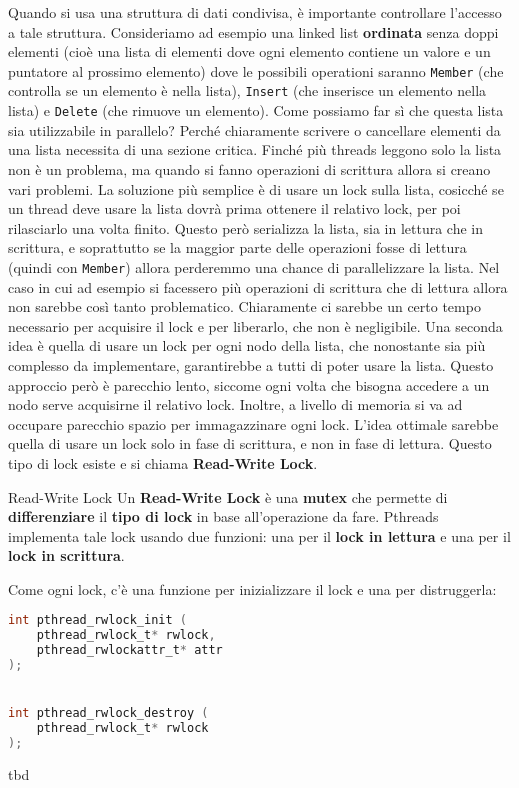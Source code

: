 Quando si usa una struttura di dati condivisa, è importante controllare l'accesso a tale struttura. Consideriamo ad esempio una linked list \textbf{ordinata} senza doppi elementi (cioè una lista di elementi dove ogni elemento contiene un valore e un puntatore al prossimo elemento) dove le possibili operationi saranno \verb|Member| (che controlla se un elemento è nella lista), \verb|Insert| (che inserisce un elemento nella lista) e \verb|Delete| (che rimuove un elemento).
\nl
Come possiamo far sì che questa lista sia utilizzabile in parallelo? Perché chiaramente scrivere o cancellare elementi da una lista necessita di una sezione critica. Finché più threads leggono solo la lista non è un problema, ma quando si fanno operazioni di scrittura allora si creano vari problemi.
\nl
La soluzione più semplice è di usare un lock sulla lista, cosicché se un thread deve usare la lista dovrà prima ottenere il relativo lock, per poi rilasciarlo una volta finito. Questo però serializza la lista, sia in lettura che in scrittura, e soprattutto se la maggior parte delle operazioni fosse di lettura (quindi con \verb|Member|) allora perderemmo una chance di parallelizzare la lista. Nel caso in cui ad esempio si facessero più operazioni di scrittura che di lettura allora non sarebbe così tanto problematico. Chiaramente ci sarebbe un certo tempo necessario per acquisire il lock e per liberarlo, che non è negligibile.
\nl
Una seconda idea è quella di usare un lock per ogni nodo della lista, che nonostante sia più complesso da implementare, garantirebbe a tutti di poter usare la lista. Questo approccio però è parecchio lento, siccome ogni volta che bisogna accedere a un nodo serve acquisirne il relativo lock. Inoltre, a livello di memoria si va ad occupare parecchio spazio per immagazzinare ogni lock.
\nl
L'idea ottimale sarebbe quella di usare un lock solo in fase di scrittura, e non in fase di lettura. Questo tipo di lock esiste e si chiama \textbf{Read-Write Lock}.

\begin{definition}{Read-Write Lock}
    Un \textbf{Read-Write Lock} è una \textbf{mutex} che permette di \textbf{differenziare} il \textbf{tipo di lock} in base all'operazione da fare. Pthreads implementa tale lock usando due funzioni: una per il \textbf{lock in lettura} e una per il \textbf{lock in scrittura}.
\end{definition}

Come ogni lock, c'è una funzione per inizializzare il lock e una per distruggerla:

\begin{codedefine}
    \begin{lstlisting}[language = C, numbers = none]
int pthread_rwlock_init (
    pthread_rwlock_t* rwlock,
    pthread_rwlockattr_t* attr
);


int pthread_rwlock_destroy (
    pthread_rwlock_t* rwlock
);\end{lstlisting}
\tcblower
tbd
\end{codedefine}

